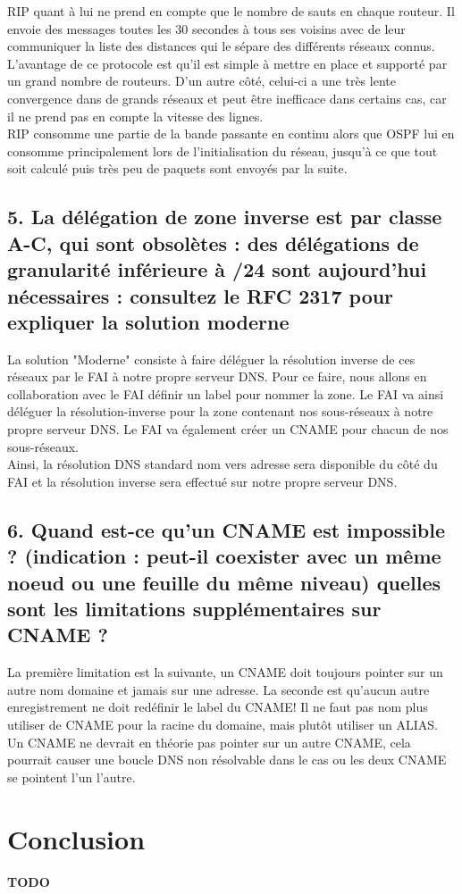 \documentclass{article}
\begin{document}
RIP quant à lui ne prend en compte que le nombre de sauts en chaque routeur. Il envoie des messages toutes les 30 secondes à tous ses voisins avec de leur communiquer la liste des distances qui le sépare des différents réseaux connus. L'avantage de ce protocole est qu'il est simple à mettre en place et supporté par un grand nombre de routeurs. D'un autre côté, celui-ci a une très lente convergence dans de grands réseaux et peut être inefficace dans certains cas, car il ne prend pas en compte la vitesse des lignes.\cite{RIP-VS-OSPF}\\

RIP consomme une partie de la bande passante en continu alors que OSPF lui en consomme principalement lors de l'initialisation du réseau, jusqu'à ce que tout soit calculé puis très peu de paquets sont envoyés par la suite.\\

\subsection*{5. La délégation de zone inverse est par classe A-C, qui sont obsolètes : des délégations de granularité inférieure à /24 sont aujourd’hui nécessaires : consultez le RFC 2317 pour expliquer la solution moderne}
La solution "Moderne" consiste à faire déléguer la résolution inverse de ces réseaux par le FAI à notre propre serveur DNS. Pour ce faire, nous allons en collaboration avec le FAI définir un label pour nommer la zone. Le FAI va ainsi déléguer la résolution-inverse pour la zone contenant nos sous-réseaux à notre propre serveur DNS. Le FAI va également créer un CNAME pour chacun de nos sous-réseaux.\\

Ainsi, la résolution DNS standard nom vers adresse sera disponible du côté du FAI et la résolution inverse sera effectué sur notre propre serveur DNS\cite{RFC-2317-ietf}\cite{RFC-2317-divers}.

\subsection*{6. Quand est-ce qu’un CNAME est impossible ? (indication : peut-il coexister avec un même noeud ou une feuille du même niveau) quelles sont les limitations supplémentaires sur CNAME ?}
La première limitation est la suivante, un CNAME\cite{CNAME} doit toujours pointer sur un autre nom domaine et jamais sur une adresse. La seconde est qu'aucun autre enregistrement ne doit redéfinir le label du CNAME! Il ne faut pas nom plus utiliser de CNAME pour la racine du domaine, mais plutôt utiliser un ALIAS\cite{ALIAS}.\\

Un CNAME ne devrait en théorie pas pointer sur un autre CNAME, cela pourrait causer une boucle DNS non résolvable dans le cas ou les deux CNAME se pointent l'un l'autre.\cite{cname-limitations}\\

\section{Conclusion}
\textbf{{\color{red} TODO}}

\newpage
\printbibliography
\end{document}
